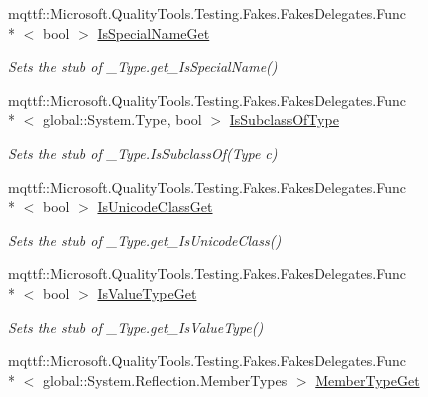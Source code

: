 \begin{DoxyCompactItemize}
mqttf\-::\-Microsoft.\-Quality\-Tools.\-Testing.\-Fakes.\-Fakes\-Delegates.\-Func\\*
$<$ bool $>$ \hyperlink{class_system_1_1_runtime_1_1_interop_services_1_1_fakes_1_1_stub___type_a7b38a29c562097585948e02b76d022b8}{Is\-Special\-Name\-Get}
\begin{DoxyCompactList}\small\item\em Sets the stub of \-\_\-\-Type.\-get\-\_\-\-Is\-Special\-Name()\end{DoxyCompactList}\item 
mqttf\-::\-Microsoft.\-Quality\-Tools.\-Testing.\-Fakes.\-Fakes\-Delegates.\-Func\\*
$<$ global\-::\-System.\-Type, bool $>$ \hyperlink{class_system_1_1_runtime_1_1_interop_services_1_1_fakes_1_1_stub___type_a6c02eac4c152f6ea39f9421d003b359b}{Is\-Subclass\-Of\-Type}
\begin{DoxyCompactList}\small\item\em Sets the stub of \-\_\-\-Type.\-Is\-Subclass\-Of(\-Type c)\end{DoxyCompactList}\item 
mqttf\-::\-Microsoft.\-Quality\-Tools.\-Testing.\-Fakes.\-Fakes\-Delegates.\-Func\\*
$<$ bool $>$ \hyperlink{class_system_1_1_runtime_1_1_interop_services_1_1_fakes_1_1_stub___type_acc3e48366a6c6469e9736c630666c2f0}{Is\-Unicode\-Class\-Get}
\begin{DoxyCompactList}\small\item\em Sets the stub of \-\_\-\-Type.\-get\-\_\-\-Is\-Unicode\-Class()\end{DoxyCompactList}\item 
mqttf\-::\-Microsoft.\-Quality\-Tools.\-Testing.\-Fakes.\-Fakes\-Delegates.\-Func\\*
$<$ bool $>$ \hyperlink{class_system_1_1_runtime_1_1_interop_services_1_1_fakes_1_1_stub___type_afca3604cbbf18a8207a7c3d3886d9a4f}{Is\-Value\-Type\-Get}
\begin{DoxyCompactList}\small\item\em Sets the stub of \-\_\-\-Type.\-get\-\_\-\-Is\-Value\-Type()\end{DoxyCompactList}\item 
mqttf\-::\-Microsoft.\-Quality\-Tools.\-Testing.\-Fakes.\-Fakes\-Delegates.\-Func\\*
$<$ global\-::\-System.\-Reflection.\-Member\-Types $>$ \hyperlink{class_system_1_1_runtime_1_1_interop_services_1_1_fakes_1_1_stub___type_a1c39cd8d4c08c70daedc31363c46f5e7}{Member\-Type\-Get}

\end{DoxyCompactItemize}
